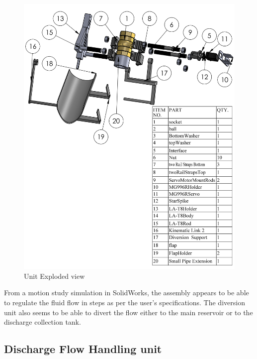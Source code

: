 \begin{figure}[H]
    \centering
    \includegraphics{Figures/DischargeFlowControlAssemblyExploded.PNG}
    \caption{Unit Exploded view}
    \label{fig:unit_exploded_view}
\end{figure}
From a motion study simulation in SolidWorks, the assembly appears to be able to regulate the fluid flow in steps as per the user's specifications. The diversion unit also seems to be able to divert the flow either to the main reservoir or to the discharge collection tank.

\subsection{Discharge Flow Handling unit}
